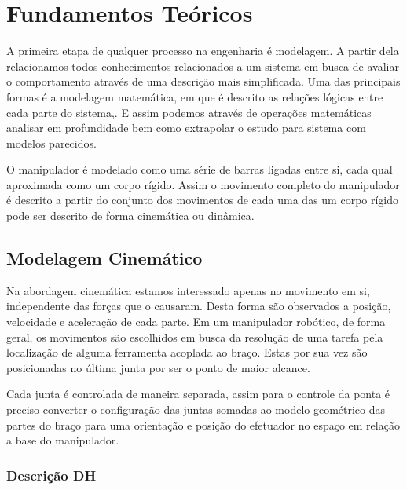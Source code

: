 \chapter{Fundamentos Teóricos}\label{ch:teory-reference}



A primeira etapa de qualquer processo na engenharia é modelagem. A partir dela relacionamos todos conhecimentos relacionados a um sistema em busca de avaliar o comportamento através de uma descrição mais simplificada. Uma das principais formas é a modelagem matemática, em que é descrito as relações lógicas entre cada parte do sistema,. E assim podemos através de operações matemáticas analisar em profundidade bem como extrapolar o estudo para sistema com modelos parecidos.

O manipulador é modelado como uma série de barras ligadas entre si, cada qual aproximada como um corpo rígido. Assim o movimento completo do manipulador é descrito a partir do conjunto dos movimentos de cada uma das  um corpo rígido pode ser descrito de forma cinemática ou dinâmica. 


\section{Modelagem Cinemático}

Na abordagem cinemática estamos interessado apenas no movimento em si, independente das forças que o causaram. Desta forma são observados a posição, velocidade e aceleração de cada parte. Em um manipulador robótico, de forma geral, os movimentos são escolhidos em busca da resolução de uma tarefa pela localização de alguma ferramenta acoplada ao braço. Estas por sua vez são posicionadas no última junta por ser o ponto de maior alcance.


Cada junta é controlada de maneira separada, assim para o controle da ponta é preciso converter o configuração das juntas somadas ao modelo geométrico das partes do braço para uma orientação e posição do efetuador no espaço em relação a base do manipulador.



\subsection{Descrição DH}

